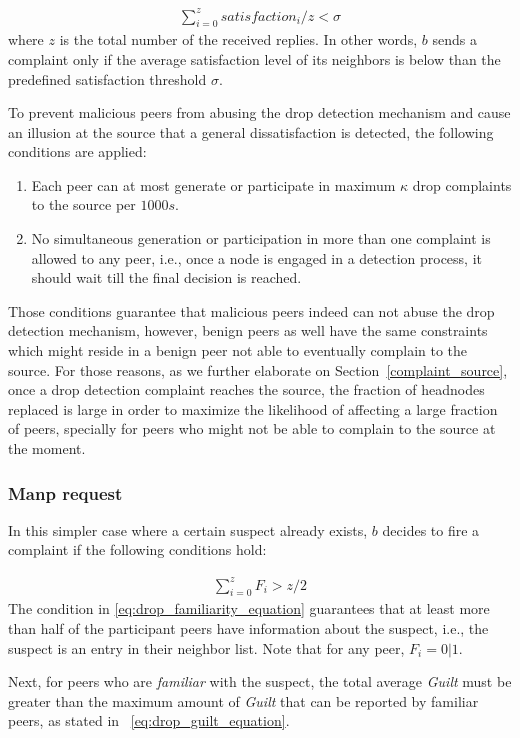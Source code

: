 \begin{align}
\label{eq:drop_satis_equation}
\sum_{i=0}^{z} satisfaction_i/z < \sigma
\end{align}
where $z$ is the total number of the received replies. 
In other words, $b$ sends a complaint only if the average satisfaction level of its neighbors is below than the predefined satisfaction threshold $\sigma$.

To prevent malicious peers from abusing the drop detection mechanism and cause an illusion at the source that a general dissatisfaction is detected, the following conditions are applied:
\begin{enumerate}
 \item Each peer can at most generate or participate in maximum $\kappa$ drop complaints to the source per $1000s$.
 \item No simultaneous generation or participation in more than one complaint is allowed to any peer, i.e., once a node is engaged in a detection process, it should wait till the final decision is reached.
\end{enumerate}
Those conditions guarantee that malicious peers indeed can not abuse the drop detection mechanism, however, benign peers as well have the same constraints which might reside in a benign peer not able to eventually complain to the source.
For those reasons, as we further elaborate on Section~\ref{complaint_source}, once a drop detection complaint reaches the source, the fraction of headnodes replaced is large in order to maximize the likelihood of affecting a large fraction of peers, specially for peers who might not be able to complain to the source at the moment.

\subsubsection*{Manp request}
In this simpler case where a certain suspect already exists, $b$ decides to fire a complaint if the following conditions hold:

\begin{align}
\label{eq:drop_familiarity_equation}
\sum_{i=0}^{z} F_i > z/2
\end{align}
The condition in \ref{eq:drop_familiarity_equation} guarantees that at least more than half of the participant peers have information about the suspect, i.e., the suspect is an entry in their neighbor list.
Note that for any peer, $F_i = 0 | 1$.

Next, for peers who are \textit{familiar} with the suspect, the total average \textit{Guilt} must be greater than the maximum amount of \textit{Guilt} that can be reported by familiar peers, as stated in ~\ref{eq:drop_guilt_equation}.

